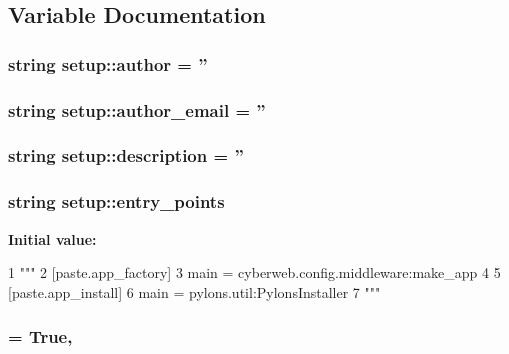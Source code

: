 \subsection{\-Variable \-Documentation}
\hypertarget{namespacesetup_a7b92894168460f935bc49467954c4a92}{
\subsubsection[{author}]{\setlength{\rightskip}{0pt plus 5cm}string {\bf setup\-::author} = ''}}\label{namespacesetup_a7b92894168460f935bc49467954c4a92}
\hypertarget{namespacesetup_a4ead8e1ca45242906fde7d5489f3beaa}{
\subsubsection[{author\-\_\-email}]{\setlength{\rightskip}{0pt plus 5cm}string {\bf setup\-::author\-\_\-email} = ''}}\label{namespacesetup_a4ead8e1ca45242906fde7d5489f3beaa}
\hypertarget{namespacesetup_a4ad612547892c74be7035043265eb65c}{
\subsubsection[{description}]{\setlength{\rightskip}{0pt plus 5cm}string {\bf setup\-::description} = ''}}\label{namespacesetup_a4ad612547892c74be7035043265eb65c}
\hypertarget{namespacesetup_a2fe64cb9ade3932eb490b30dc5758d50}{
\subsubsection[{entry\-\_\-points}]{\setlength{\rightskip}{0pt plus 5cm}string {\bf setup\-::entry\-\_\-points}}}\label{namespacesetup_a2fe64cb9ade3932eb490b30dc5758d50}
{\bfseries \-Initial value\-:}
\begin{DoxyCode}
1 """
2     [paste.app_factory]
3     main = cyberweb.config.middleware:make_app
4 
5     [paste.app_install]
6     main = pylons.util:PylonsInstaller
7     """
\end{DoxyCode}
\hypertarget{namespacesetup_a6548d07bffe2114176be01447602d0e3}{
\subsubsection[{include\-\_\-package\-\_\-data}]{ = \-True,}}\label{namespacesetup_a6548d07bffe2114176be01447602d0e3}
